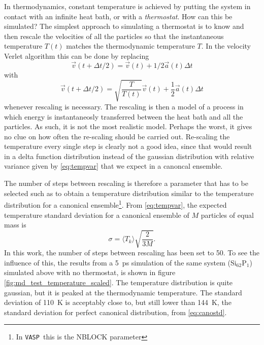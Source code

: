 \documentclass[11pt,bibliography=totoc,index=totoc]{scrbook}   %
\newcommand{\vasp}{{\texttt{VASP}}} %
\begin{document}
In thermodynamics, constant temperature is achieved by putting the system in contact with an infinite heat bath, or with a \emph{thermostat}.
How can this be simulated?
The simplest approach to simulating a thermostat is to know and then rescale the velocities of all the particles so that the instantaneous temperature $T(t)$ matches the thermodynamic temperature $T$. In the velocity Verlet algorithm this can be done by replacing
\begin{equation}
  \vec{v}\left(t+\Delta t/2\right) = \vec{v}(t) + 1/2 \vec{a}(t) \Delta t
\end{equation}
with
\begin{equation}
  \vec{v}(t+\Delta t/2) = \sqrt{\frac{T}{T(t)}} \vec{v}(t) + \frac12 \vec{a}(t)\Delta t
\end{equation}
whenever rescaling is necessary.
The rescaling is then a model of a process in which energy is instantaneosly transferred between the heat bath and all the particles. 
As such, it is not the most realistic model. 
Perhaps the worst, it gives no clue on how often the re-scaling should be carried out. 
Re-scaling the temperature every single step is clearly not a good idea, since that would result in a delta function distribution instead of the gaussian distribution with relative variance given by \eqref{eq:tempvar} that we expect in a canoncal ensemble.

The number of steps between rescaling is therefore a parameter that has to be selected such as to obtain a temperature distribution similar to the temperature distribution for a canonical ensemble\footnote{In \vasp\ this is the NBLOCK parameter}. 
From \eqref{eq:tempvar}, the expected temperature standard deviation for a canonical ensemble of $M$ particles of equal mass is
\begin{equation}
  \sigma = \langle T_k \rangle \sqrt{\frac{2}{3M}}.
  \label{eq:canostd}
\end{equation}
In this work, the number of steps between rescaling has been set to 50. 
To see the influence of this, the results from a 5~ps simulation of the same system (Si$_{62}$P$_1$) simulated above with no thermostat, is shown in figure \ref{fig:md_test_temperature_scaled}.
The temperature distribution is quite gaussian, but it is peaked at the thermodynamic temperature.
The standard deviation of 110~K is acceptably close to, but still lower than 144~K, the standard deviation for perfect canonical distribution, from \eqref{eq:canostd}.

%
\end{document}
